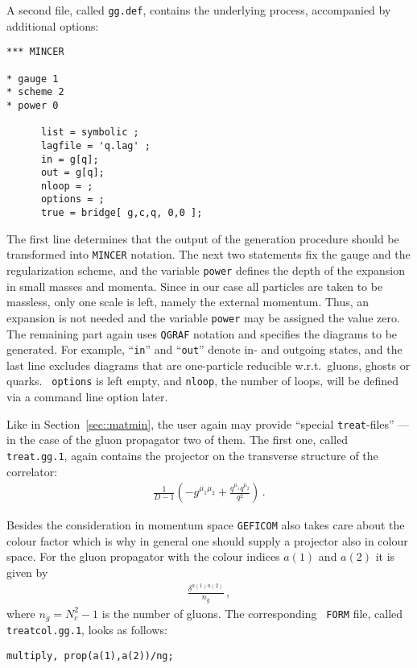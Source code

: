 A second file, called {\tt gg.def}, contains the underlying process,
accompanied by additional options:
\begin{verbatim}
*** MINCER

* gauge 1
* scheme 2
* power 0

      list = symbolic ;
      lagfile = 'q.lag' ;
      in = g[q];
      out = g[q]; 
      nloop = ;
      options = ;
      true = bridge[ g,c,q, 0,0 ]; 
\end{verbatim}
The first line determines that the output of the generation procedure
should be transformed into {\tt MINCER} notation.  The next two
statements fix the gauge and the regularization scheme, and the variable
\verb/power/ defines the depth of the expansion in small masses and
momenta.  Since in our case all particles are taken to be massless, only
one scale is left, namely the external momentum. Thus, an expansion is
not needed and the variable \verb/power/ may be assigned the value zero.
The remaining part again uses {\tt QGRAF} notation and specifies the
diagrams to be generated.  For example, ``\verb/in/'' and ``\verb/out/''
denote in- and outgoing states, and the last line excludes diagrams that
are one-particle reducible w.r.t.\ gluons, ghosts or quarks.  {\tt
  options} is left empty, and {\tt nloop}, the number of loops, will be
defined via a command line option later.

Like in Section~\ref{sec::matmin}, the user again may provide ``special
{\tt treat}-files'' --- in the case of the gluon propagator two of them.
The first one, called
{\tt treat.gg.1}, again contains the projector on the transverse
structure of the correlator:
\begin{eqnarray}
\frac{1}{D-1}\left(-g^{\mu_1\mu_2}+\frac{q^{\mu_1}q^{\mu_2}}{q^2}\right)
\,.
\end{eqnarray}

Besides the consideration in momentum space 
{\tt GEFICOM} also takes care about the colour factor which is why in
general one should supply a projector also in colour space.
For the gluon propagator with the colour indices $a(1)$ and $a(2)$ it is
given by
\begin{eqnarray}
\frac{\delta^{a(1)a(2)}}{n_g}
\,,
\end{eqnarray}
where $n_g=N_c^2-1$ is the number of gluons. The corresponding {\tt
  FORM} file, called {\tt treatcol.gg.1}, looks as follows:
\begin{verbatim}
multiply, prop(a(1),a(2))/ng;
\end{verbatim}

